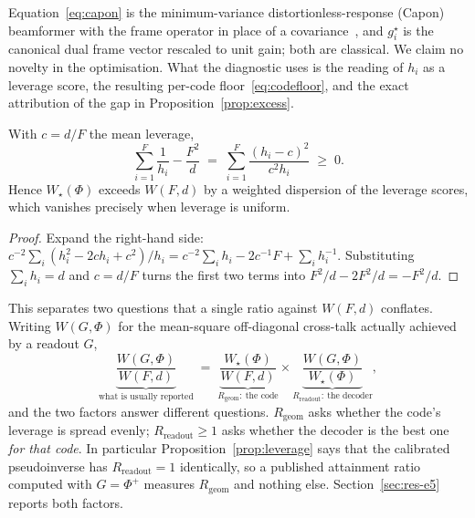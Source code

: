 \begin{remark}[Provenance]
\label{rem:capon}
Equation~\eqref{eq:capon} is the minimum-variance distortionless-response (Capon) beamformer with
the frame operator in place of a covariance~\cite{capon1969}, and $g_i^{\star}$ is the canonical
dual frame vector rescaled to unit gain; both are classical. We claim no
novelty in the optimisation. What the diagnostic uses is the reading of $h_i$ as a leverage
score, the resulting per-code floor~\eqref{eq:codefloor}, and the exact attribution of the gap
in Proposition~\ref{prop:excess}.
\end{remark}

\begin{proposition}
\label{prop:excess}
With $c=d/F$ the mean leverage,
\[
  \sum_{i=1}^{F}\frac1{h_i}-\frac{F^2}{d}\;=\;\sum_{i=1}^{F}\frac{(h_i-c)^2}{c^{2}h_i}\;\ge\;0 .
\]
Hence $W_{\star}(\Phi)$ exceeds $W(F,d)$ by a weighted dispersion of the leverage scores, which
vanishes precisely when leverage is uniform.
\end{proposition}

\begin{proof}
Expand the right-hand side: $c^{-2}\sum_i(h_i^2-2ch_i+c^2)/h_i
=c^{-2}\sum_ih_i-2c^{-1}F+\sum_ih_i^{-1}$. Substituting $\sum_ih_i=d$ and $c=d/F$ turns the
first two terms into $F^2/d-2F^2/d=-F^2/d$.
\end{proof}

This separates two questions that a single ratio against $W(F,d)$ conflates. Writing
$W(G,\Phi)$ for the mean-square off-diagonal cross-talk actually achieved by a readout $G$,
\begin{equation}
  \underbrace{\frac{W(G,\Phi)}{W(F,d)}}_{\text{what is usually reported}}
  \;=\;\underbrace{\frac{W_{\star}(\Phi)}{W(F,d)}}_{R_{\mathrm{geom}}:\ \text{the code}}
  \times
  \underbrace{\frac{W(G,\Phi)}{W_{\star}(\Phi)}}_{R_{\mathrm{readout}}:\ \text{the decoder}} ,
  \label{eq:decomposition}
\end{equation}
and the two factors answer different questions. $R_{\mathrm{geom}}$ asks whether the code's
leverage is spread evenly; $R_{\mathrm{readout}}\ge1$ asks whether the decoder is the best one
\emph{for that code}. In particular Proposition~\ref{prop:leverage} says that the calibrated
pseudoinverse has $R_{\mathrm{readout}}=1$ identically, so a published attainment ratio computed
with $G=\Phi^{+}$ measures $R_{\mathrm{geom}}$ and nothing else. Section~\ref{sec:res-e5} reports
both factors.

